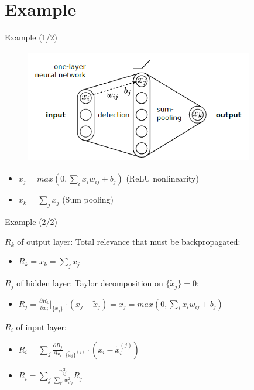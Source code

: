 \documentclass{beamer}
\begin{document}
\section{Example}
\begin{frame}{Example (1/2)}

\begin{figure}[ht]
	\centering
    \includegraphics[width=10cm, height=5cm]{figures/one_layer_network}
	\label{fig:OneLayerNetwork}
\end{figure}

\begin{itemize}
\item $x_j = max(0, \sum_i x_i w_{ij} + b_j)$ (ReLU nonlinearity)
\item $x_k = \sum_j x_j$ (Sum pooling)
\end{itemize}

\end{frame}

\begin{frame}{Example (2/2)}

$R_k$ of output layer: Total relevance that must be backpropagated:
\begin{itemize}
\item $R_k = x_k = \sum_j x_j$ 
\end{itemize}

$R_j$ of hidden layer: Taylor decomposition on $\{ \tilde{x}_j \} = 0$:
\begin{itemize}
\item $R_j = \frac{\partial R_k}{\partial x_j} \biggr\rvert_{\{ \tilde{x}_j \}} \cdot (x_j - \tilde{x}_j) = x_j = max(0, \sum_i x_i w_{ij} + b_j)$ 
\end{itemize}

$R_i$ of input layer: 
\begin{itemize}
\item $R_i = \sum_j \frac{\partial R_j}{\partial x_i} \biggr\rvert_{\{ \tilde{x}_i \}^{(j)}} \cdot (x_i - \tilde{x}_i^{(j)})$
\item $R_i = \sum_j \frac{w_{ij}^2}{\sum_{i'} w_{i'j}^2} R_j$ 
\end{itemize}

\end{frame}
\end{document}

